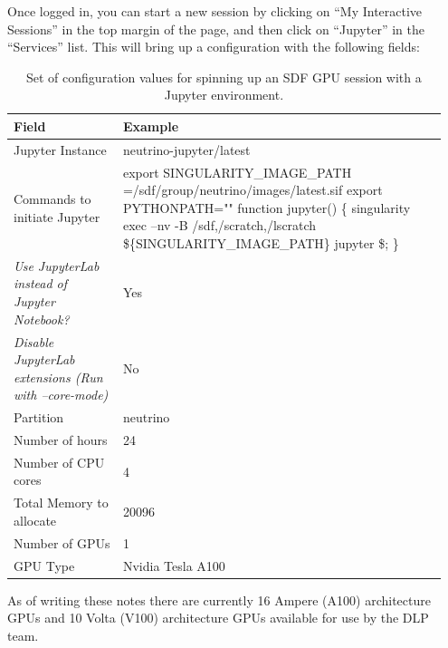 \documentclass[8pt]{refart}
\begin{document}
Once logged in, you can start a new session by clicking on ``My Interactive Sessions'' in the top margin of the page, and then click on ``Jupyter'' in the ``Services'' list.  This will bring up a configuration with the following fields:
\begin{table}[H]
\centering
\begin{tabular}{|p{0.24\linewidth}|p{0.71\linewidth}|}
    \hline
     Field & Example\\
     \hline
     \hline
     Jupyter Instance & neutrino-jupyter/latest\\
     \hline
     Commands to initiate Jupyter & \makecell[l]{export SINGULARITY\_IMAGE\_PATH\\
                                                 =/sdf/group/neutrino/images/latest.sif\\ 
                                                 export PYTHONPATH=""\\
                                                 function jupyter() \{ singularity exec --nv -B\\
                                                 /sdf,/scratch,/lscratch\\
                                                 \$\{SINGULARITY\_IMAGE\_PATH\} jupyter \$\@; \}}\\
     \hline
     \textit{Use JupyterLab instead of Jupyter Notebook?} & Yes\\
     \hline
     \textit{Disable JupyterLab extensions (Run with --core-mode)} & No\\
     \hline
     Partition & neutrino\\
     \hline
     Number of hours & 24\\
     \hline
     Number of CPU cores & 4\\
     \hline
     Total Memory to allocate & 20096\\
     \hline
     Number of GPUs & 1 \\
     \hline
     GPU Type & Nvidia Tesla A100\\
     \hline
\end{tabular}
\caption{Set of configuration values for spinning up an SDF GPU session with a Jupyter environment.}
\end{table}
As of writing these notes there are currently 16 Ampere (A100) architecture GPUs and 10 Volta (V100) architecture GPUs available for use by the DLP team.
\end{document}

